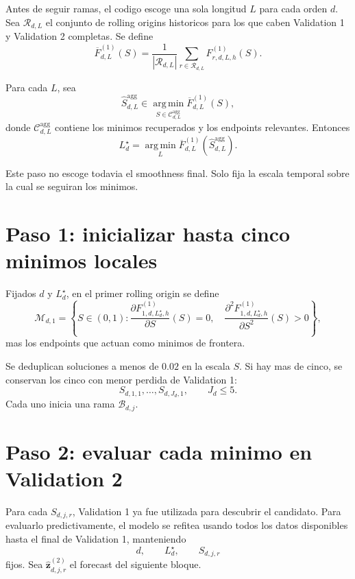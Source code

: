 \documentclass[11pt]{article}
\newcommand{\argmin}{\operatorname*{arg\,min}}
\begin{document}
Antes de seguir ramas, el codigo escoge una sola longitud \(L\) para cada
orden \(d\). Sea \(\mathcal{R}_{d,L}\) el conjunto de rolling origins historicos
para los que caben Validation 1 y Validation 2 completas. Se define
\begin{equation}
\overline F^{(1)}_{d,L}(S)
=
\frac{1}{|\mathcal{R}_{d,L}|}
\sum_{r\in\mathcal{R}_{d,L}}
F^{(1)}_{r,d,L,h}(S).
\label{eq:aggregate}
\end{equation}

Para cada \(L\), sea
\[
\widehat S_{d,L}^{\mathrm{agg}}
\in
\argmin_{S\in\mathcal{C}_{d,L}^{\mathrm{agg}}}
\overline F^{(1)}_{d,L}(S),
\]
donde \(\mathcal{C}_{d,L}^{\mathrm{agg}}\) contiene los minimos recuperados y
los endpoints relevantes. Entonces
\begin{equation}
L_d^\star
=
\argmin_L
\overline F^{(1)}_{d,L}
\left(
\widehat S_{d,L}^{\mathrm{agg}}
\right).
\label{eq:Lselection}
\end{equation}

Este paso no escoge todavia el smoothness final. Solo fija la escala temporal
sobre la cual se seguiran los minimos.

\section{Paso 1: inicializar hasta cinco minimos locales}

Fijados \(d\) y \(L_d^\star\), en el primer rolling origin se define
\begin{equation}
\mathcal{M}_{d,1}
=
\left\{
S\in(0,1):
\frac{\partial F^{(1)}_{1,d,L_d^\star,h}}{\partial S}(S)=0,
\quad
\frac{\partial^2 F^{(1)}_{1,d,L_d^\star,h}}{\partial S^2}(S)>0
\right\},
\label{eq:firstminima}
\end{equation}
mas los endpoints que actuan como minimos de frontera.

Se deduplican soluciones a menos de \(0.02\) en la escala \(S\). Si hay mas de
cinco, se conservan los cinco con menor perdida de Validation 1:
\[
S_{d,1,1},\ldots,S_{d,J_d,1},
\qquad
J_d\le5.
\]
Cada uno inicia una rama \(\mathcal{B}_{d,j}\).

\section{Paso 2: evaluar cada minimo en Validation 2}

Para cada \(S_{d,j,r}\), Validation 1 ya fue utilizada para descubrir el
candidato. Para evaluarlo predictivamente, el modelo se refitea usando todos
los datos disponibles hasta el final de Validation 1, manteniendo
\[
d,
\qquad
L_d^\star,
\qquad
S_{d,j,r}
\]
fijos. Sea \(\widehat{\bm z}^{(2)}_{d,j,r}\) el forecast del siguiente bloque.
\end{document}
